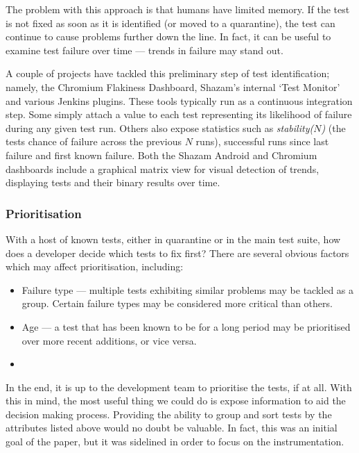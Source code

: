 The problem with this approach is that humans have limited memory. If the \flaky
test is not fixed as soon as it is identified (or moved to a quarantine), the
test can continue to cause problems further down the line. In fact, it can be
useful to examine test failure over time --- trends in failure may stand out.

A couple of projects have tackled this preliminary step of \flaky test
identification; namely, the Chromium Flakiness
Dashboard\cite{flakinessDashboard}, Shazam’s internal {\lq}\flaky Test
Monitor{\rq} and various Jenkins plugins. These tools typically run as a
continuous integration step. Some simply attach a value to each test
representing its likelihood of failure during any given test run. Others also
expose statistics such as \emph{stability($N$)} (the tests chance of failure
across the previous $N$ runs), successful runs since last failure and first
known failure. Both the Shazam Android and Chromium dashboards include a
graphical matrix view for visual detection of trends, displaying tests and their
binary results over time.

\subsubsection{Prioritisation}

With a host of known \flaky tests, either in quarantine or in the main test
suite, how does a developer decide which tests to fix first? There are several
obvious factors which may affect prioritisation, including:
\begin{itemize}
	\item Failure type --- multiple \flaky tests exhibiting similar problems may
	be tackled as a group. Certain failure types may be considered more critical than others.
	\item Age --- a \flaky test that has been known to be \flaky for a long period
	may be prioritised over more recent additions, or vice versa.
	\item {}
\end{itemize}

In the end, it is up to the development team to prioritise the \flaky tests, if
at all. With this in mind, the most useful thing we could do is expose
information to aid the decision making process. Providing the ability to group
and sort \flaky tests by the attributes listed above would no doubt be valuable.
In fact, this was an initial goal of the paper, but it was sidelined in order to
focus on the instrumentation.


